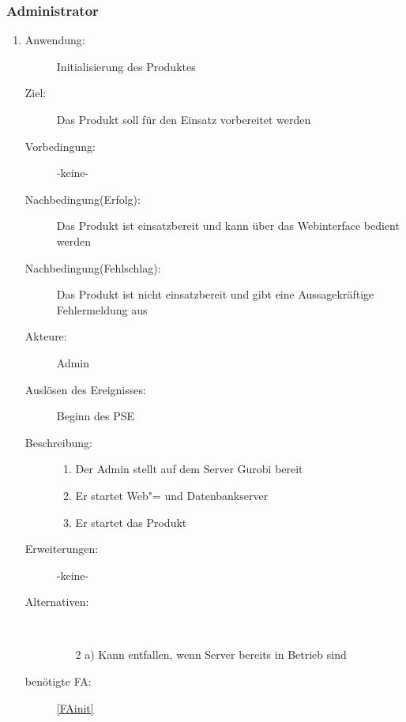\documentclass[parskip=full]{scrartcl}
\newcommand{\swtLabel}[1]{\textbf{/#1\arabic*0/}}
\begin{document}
\subsubsection{Administrator}
\begin{enumerate} [label=\swtLabel{A}]
	
	\item
	\begin{description}
		\item[Anwendung:] Initialisierung des Produktes
		\item[Ziel:] Das Produkt soll für den Einsatz vorbereitet werden
		\item[Vorbedingung:] -keine-
		\item[Nachbedingung(Erfolg):] Das Produkt ist einsatzbereit und kann über das Webinterface bedient werden
		\item[Nachbedingung(Fehlschlag):] Das Produkt ist nicht einsatzbereit und gibt eine Aussagekräftige Fehlermeldung aus
		\item[Akteure:] \gls{Admin}
		\item[Auslösen des Ereignisses:] Beginn des \gls{PSE}
		\item[Beschreibung:]
		\begin{enumerate} [label=\arabic*.]~
			\item Der \gls{Admin} stellt auf dem Server Gurobi bereit %
			\item Er startet Web"= und Datenbankserver 
			\item Er startet das Produkt
		\end{enumerate}
		\item[Erweiterungen:] -keine-
		\item[Alternativen:]~
		\begin{enumerate}
			\item[2 a)] Kann entfallen, wenn Server bereits in Betrieb sind
		\end{enumerate}
		\item[benötigte FA:] \ref{FAinit}
	\end{description}
	

\end{enumerate}
\end{document}
